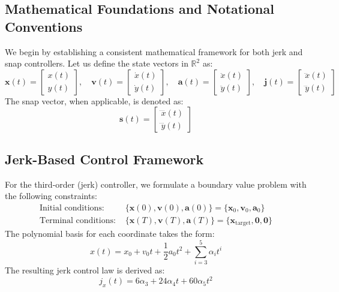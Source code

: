 \documentclass[12pt]{article}
\begin{document}
\subsection{Mathematical Foundations and Notational Conventions}
We begin by establishing a consistent mathematical framework for both jerk and snap controllers. Let us define the state vectors in $\mathbb{R}^2$ as:
\begin{equation}
\mathbf{x}(t) = \begin{bmatrix} x(t) \\ y(t) \end{bmatrix}, \quad
\mathbf{v}(t) = \begin{bmatrix} \dot{x}(t) \\ \dot{y}(t) \end{bmatrix}, \quad
\mathbf{a}(t) = \begin{bmatrix} \ddot{x}(t) \\ \ddot{y}(t) \end{bmatrix}, \quad
\mathbf{j}(t) = \begin{bmatrix} \dddot{x}(t) \\ \dddot{y}(t) \end{bmatrix}
\end{equation}
The snap vector, when applicable, is denoted as:
\begin{equation}
\mathbf{s}(t) = \begin{bmatrix} \ddddot{x}(t) \\ \ddddot{y}(t) \end{bmatrix}
\end{equation}

\subsection{Jerk-Based Control Framework}
For the third-order (jerk) controller, we formulate a boundary value problem with the following constraints:
\begin{align*}
\text{Initial conditions: } & \{\mathbf{x}(0), \mathbf{v}(0), \mathbf{a}(0)\} = \{\mathbf{x}_0, \mathbf{v}_0, \mathbf{a}_0\} \\
\text{Terminal conditions: } & \{\mathbf{x}(T), \mathbf{v}(T), \mathbf{a}(T)\} = \{\mathbf{x}_\text{target}, \mathbf{0}, \mathbf{0}\}
\end{align*}
The polynomial basis for each coordinate takes the form:
\begin{equation}
x(t) = x_0 + v_0t + \frac{1}{2}a_0t^2 + \sum_{i=3}^5 \alpha_i t^i
\end{equation}
The resulting jerk control law is derived as:
\begin{equation}
j_x(t) = 6\alpha_3 + 24\alpha_4t + 60\alpha_5t^2
\end{equation}
\end{document}
